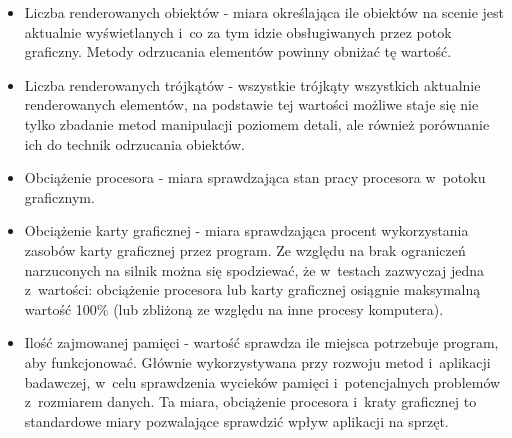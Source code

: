 \documentclass[a4paper,twoside,12pt]{book}
\begin{document}
\begin{itemize}
    \item Liczba renderowanych obiektów - miara określająca ile obiektów na scenie jest aktualnie wyświetlanych i~co za tym idzie obsługiwanych przez potok graficzny. Metody odrzucania elementów powinny obniżać tę wartość.
    \item Liczba renderowanych trójkątów - wszystkie trójkąty wszystkich aktualnie renderowanych elementów, na podstawie tej wartości możliwe staje się nie tylko zbadanie metod manipulacji poziomem detali, ale również porównanie ich do technik odrzucania obiektów.
    \item Obciążenie procesora - miara sprawdzająca stan pracy procesora w~potoku graficznym.
    \item Obciążenie karty graficznej - miara sprawdzająca procent wykorzystania zasobów karty graficznej przez program. Ze względu na brak ograniczeń narzuconych na silnik można się spodziewać, że w~testach zazwyczaj jedna z~wartości: obciążenie procesora lub karty graficznej osiągnie maksymalną wartość 100\% (lub zbliżoną ze względu na inne procesy komputera).
    \item Ilość zajmowanej pamięci - wartość sprawdza ile miejsca potrzebuje program, aby funkcjonować. Głównie wykorzystywana przy rozwoju metod i~aplikacji badawczej, w~celu sprawdzenia wycieków pamięci i~potencjalnych problemów z~rozmiarem danych. Ta miara, obciążenie procesora i~kraty graficznej to standardowe miary pozwalające sprawdzić wpływ aplikacji na sprzęt.
\end{itemize}

\vbox{}
\end{document}
